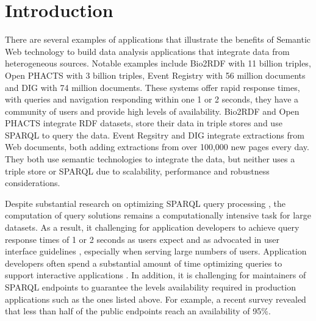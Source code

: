 \section{Introduction}
There are several examples of applications that illustrate the benefits of Semantic Web technology to build data analysis applications that integrate data from heterogeneous sources.
Notable examples include Bio2RDF \cite{callahan2013bio2rdf} with 11 billion triples, Open PHACTS \cite{Groth_Loizou_Gray_Goble_Harland_Pettifer_2014} with 3 billion triples, Event Registry \cite{Leban_Fortuna_Brank_Grobelnik_2014} with 56 million documents and DIG \cite{szekely2015building} with 74 million documents.
These systems offer rapid response times, with queries and navigation responding within one 1 or 2 seconds, they have a community of users and provide high levels of availability.
Bio2RDF and Open PHACTS integrate RDF datasets, store their data in triple stores and use SPARQL to query the data.
Event Regsitry and DIG integrate extractions from Web documents, both adding extractions from over 100,000 new pages every day.
They both use semantic technologies to integrate the data, but neither uses a triple store or SPARQL due to scalability, performance and robustness considerations.

Despite substantial research on optimizing SPARQL query processing \cite{Pham2013}, the computation of query solutions remains a computationally intensive task for large datasets.
As a result, it challenging for application developers to achieve query response times of 1 or 2 seconds as users expect and as advocated in user interface guidelines \cite{nielsen1994usability}, especially when serving large numbers of users.
Application developers often spend a substantial amount of time optimizing queries to support interactive applications \cite{Loizou_Angles_Groth_2014}.
In addition, it is challenging for maintainers of SPARQL endpoints to guarantee the levels availability required in production applications such as the ones listed above.
For example, a recent survey \cite{buil2013sparql} revealed that less than half of the public endpoints reach an availability of 95\%.

